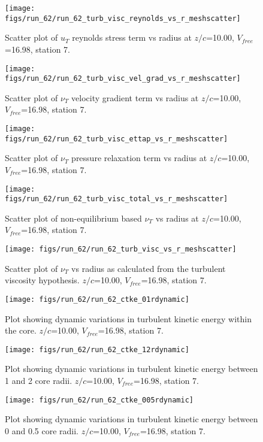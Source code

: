 \begin{figure}[H]
\centering
\texttt{[image: figs/run\_62/run\_62\_turb\_visc\_reynolds\_vs\_r\_meshscatter]}
\caption{Scatter plot of $
u_T$ reynolds stress term vs radius at $z/c$=10.00, $V_{free}$=16.98, station 7.}
\end{figure}


\begin{figure}[H]
\centering
\texttt{[image: figs/run\_62/run\_62\_turb\_visc\_vel\_grad\_vs\_r\_meshscatter]}
\caption{Scatter plot of $\nu_T$ velocity gradient term vs radius at $z/c$=10.00, $V_{free}$=16.98, station 7.}
\end{figure}


\begin{figure}[H]
\centering
\texttt{[image: figs/run\_62/run\_62\_turb\_visc\_ettap\_vs\_r\_meshscatter]}
\caption{Scatter plot of $\nu_T$ pressure relaxation term vs radius at $z/c$=10.00, $V_{free}$=16.98, station 7.}
\end{figure}


\begin{figure}[H]
\centering
\texttt{[image: figs/run\_62/run\_62\_turb\_visc\_total\_vs\_r\_meshscatter]}
\caption{Scatter plot of non-equilibrium based $\nu_T$ vs radius at $z/c$=10.00, $V_{free}$=16.98, station 7.}
\end{figure}


\begin{figure}[H]
\centering
\texttt{[image: figs/run\_62/run\_62\_turb\_visc\_vs\_r\_meshscatter]}
\caption{Scatter plot of $\nu_T$ vs radius as calculated from the turbulent viscosity hypothesis. $z/c$=10.00, $V_{free}$=16.98, station 7.}
\end{figure}


\begin{figure}[H]
\centering
\texttt{[image: figs/run\_62/run\_62\_ctke\_01rdynamic]}
\caption{Plot showing dynamic variations in turbulent kinetic energy within the core. $z/c$=10.00, $V_{free}$=16.98, station 7.}
\end{figure}


\begin{figure}[H]
\centering
\texttt{[image: figs/run\_62/run\_62\_ctke\_12rdynamic]}
\caption{Plot showing dynamic variations in turbulent kinetic energy between 1 and 2 core radii. $z/c$=10.00, $V_{free}$=16.98, station 7.}
\end{figure}


\begin{figure}[H]
\centering
\texttt{[image: figs/run\_62/run\_62\_ctke\_005rdynamic]}
\caption{Plot showing dynamic variations in turbulent kinetic energy between 0 and 0.5 core radii. $z/c$=10.00, $V_{free}$=16.98, station 7.}
\end{figure}


